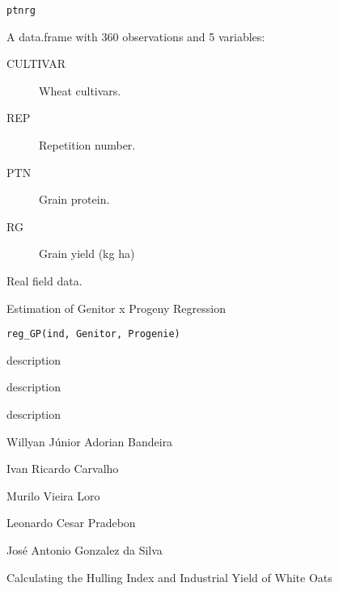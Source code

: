 \documentclass[a4paper]{book}
\begin{document}
%
\begin{Usage}
\begin{verbatim}
ptnrg
\end{verbatim}
\end{Usage}
%
\begin{Format}
A data.frame with 360 observations and 5 variables:
\begin{description}

\item[CULTIVAR] Wheat cultivars.
\item[REP] Repetition number.
\item[PTN] Grain protein.
\item[RG] Grain yield (kg ha)

\end{description}

\end{Format}
%
\begin{Source}
Real field data.
\end{Source}
%
\begin{Description}
Estimation of Genitor x Progeny Regression
\end{Description}
%
\begin{Usage}
\begin{verbatim}
reg_GP(ind, Genitor, Progenie)
\end{verbatim}
\end{Usage}
%
\begin{Arguments}
\begin{ldescription}
\item[\code{ind}] description

\item[\code{Genitor}] description

\item[\code{Progenie}] description
\end{ldescription}
\end{Arguments}
%
\begin{Author}
Willyan Júnior Adorian Bandeira

Ivan Ricardo Carvalho

Murilo Vieira Loro

Leonardo Cesar Pradebon

José Antonio Gonzalez da Silva
\end{Author}
%
\begin{Description}
Calculating the Hulling Index and Industrial Yield of White Oats
\end{Description}
\end{document}
